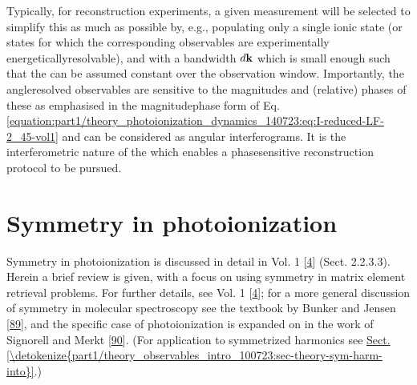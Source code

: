 \documentclass[letterpaper,table,10pt,english]{jupyterBook}
\begin{document}
\sphinxAtStartPar
Typically, for reconstruction experiments, a given measurement will be
selected to simplify this as much as possible by, e.g., populating only
a single ionic state (or states for which the corresponding observables
are experimentally energetically\sphinxhyphen{}resolvable), and with a bandwidth
\(d\bf{k}\) which is small enough such that the {\hyperref[\detokenize{backmatter/glossary:term-radial-matrix-elements}]{}} can be
assumed constant over the observation window. Importantly, the angle\sphinxhyphen{}resolved observables are
sensitive to the magnitudes and (relative) phases of these {\hyperref[\detokenize{backmatter/glossary:term-radial-matrix-elements}]{}} \sphinxhyphen{} as emphasised in the magnitude\sphinxhyphen{}phase form of Eq. \eqref{equation:part1/theory_photoionization_dynamics_140723:eq:I-reduced-LF-2_45-vol1} \sphinxhyphen{} and can be considered as angular interferograms. It is the interferometric nature of the {\hyperref[\detokenize{backmatter/glossary:term-PADs}]{}} which enables a phase\sphinxhyphen{}sensitive reconstruction protocol to be pursued.

\sphinxstepscope


\section{Symmetry in photoionization}
\label{\detokenize{part1/theory_symmetry_140723:symmetry-in-photoionization}}\label{\detokenize{part1/theory_symmetry_140723:sec-theory-symmetry-intro}}\label{\detokenize{part1/theory_symmetry_140723::doc}}
\sphinxAtStartPar
Symmetry in photoionization is discussed in detail in  Vol. 1 {[}\hyperlink{cite.backmatter/bibliography:id677}{4}{]} (Sect. 2.2.3.3). Herein a brief review is given, with a focus on using symmetry in matrix element retrieval problems. For further details, see  Vol. 1 {[}\hyperlink{cite.backmatter/bibliography:id677}{4}{]}; for a more general discussion of symmetry in molecular spectroscopy see the textbook by  Bunker and Jensen {[}\hyperlink{cite.backmatter/bibliography:id548}{89}{]}, and the specific case of photoionization is expanded on in the work of Signorell and Merkt {[}\hyperlink{cite.backmatter/bibliography:id889}{90}{]}. (For application to symmetrized harmonics see \hyperref[\detokenize{part1/theory_observables_intro_100723:sec-theory-sym-harm-into}]{Sect.\@ \ref{\detokenize{part1/theory_observables_intro_100723:sec-theory-sym-harm-into}}}.)
\end{document}

